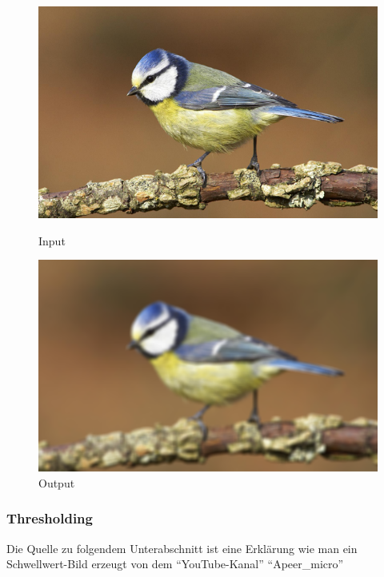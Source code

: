 \begin{figure}[htb]
  \centering
  \begin{minipage}[t]{0.45\linewidth}
    \centering
    \includegraphics[width=\linewidth]{pics/bildverarbeitungsalgos/input.png}
    \caption{Input \cite{maai:input:cite}}
    \label{maai:gaussianblur:input}
  \end{minipage}
  \hfill
  \begin{minipage}[t]{0.45\linewidth}
    \centering
    \includegraphics[width=\linewidth]{pics/bildverarbeitungsalgos/gaussianblur_output.png}
    \caption{Output}
    \label{maai:gaussianblur:output}
  \end{minipage}
\end{figure}


\subsubsection{Thresholding}
Die Quelle zu folgendem Unterabschnitt ist eine Erklärung wie man ein Schwellwert-Bild erzeugt von dem ``YouTube-Kanal'' ``Apeer\_micro'' \cite{thresholding:cite}

